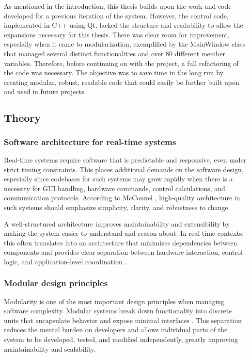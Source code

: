 As mentioned in the introduction, this thesis builds upon the work and code developed for a previous iteration of the system. However, the control code, implemented in C++ using Qt, lacked the structure and readability to allow the expansions necessary for this thesis. There was clear room for improvement, especially when it came to modularization, exemplified by the MainWindow class that managed several distinct functionalities and over 80 different member variables. Therefore, before continuing on with the project, a full refactoring of the code was necessary. The objective was to save time in the long run by creating modular, robust, readable code that could easily be further built upon and used in future projects.

\subsection{Theory}
\subsubsection{Software architecture for real-time systems}
Real-time systems require software that is predictable and responsive, even under strict timing constraints. This places additional demands on the software design, especially since codebases for such systems may grow rapidly when there is a necessity for GUI handling, hardware commands, control calculations, and communication protocols. According to McConnel \cite{steve_mcconnell_code_nodate}, high-quality architecture in such systems should emphasize simplicity, clarity, and robustness to change. 

A well-structured architecture improves maintainability and extensibility by making the system easier to understand and reason about. In real-time contexts, this often translates into an architecture that minimizes dependencies between components and provides clear separation between hardware interaction, control logic, and application-level coordination \cite{tanenbaum_distributed_2007}.

\subsubsection{Modular design principles}
Modularity is one of the most important design principles when managing software complexity. Modular systems break down functionality into discrete units that encapsulate behavior and expose minimal interfaces \cite{steve_mcconnell_code_nodate}. This separation reduces the mental burden on developers and allows individual parts of the system to be developed, tested, and modified independently, greatly improving maintainability and scalability.

